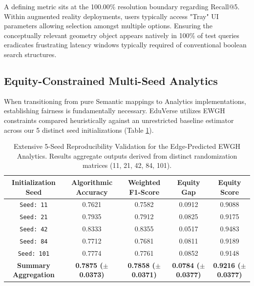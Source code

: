 \documentclass[conference]{IEEEtran}
\begin{document}
A defining metric sits at the 100.00\% resolution boundary regarding Recall@5. Within augmented reality deployments, users typically access "Tray" UI parameters allowing selection amongst multiple options. Ensuring the conceptually relevant geometry object appears natively in 100\% of test queries eradicates frustrating latency windows typically required of conventional boolean search structures. 

\subsection{Equity-Constrained Multi-Seed Analytics}

When transitioning from pure Semantic mappings to Analytics implementations, establishing fairness is fundamentally necessary. EduVerse utilizes EWGH constraints compared heuristically against an unrestricted baseline estimator across our 5 distinct seed initializations (Table \ref{tab:seed_results_ext}).

\begin{table}[t]
\centering
\caption{Extensive 5-Seed Reproducibility Validation for the Edge-Predicted EWGH Analytics. Results aggregate outputs derived from distinct randomization matrices (11, 21, 42, 84, 101).}
\label{tab:seed_results_ext}
\begin{tabular}{ccccc}
\toprule
\textbf{Initialization Seed} & \textbf{Algorithmic Accuracy} & \textbf{Weighted F1-Score} & \textbf{Equity Gap} & \textbf{Equity Score} \\
\midrule
\texttt{Seed: 11} & 0.7621 & 0.7582 & 0.0912 & 0.9088 \\
\texttt{Seed: 21} & 0.7935 & 0.7912 & 0.0825 & 0.9175 \\
\texttt{Seed: 42} & 0.8333 & 0.8355 & 0.0517 & 0.9483 \\
\texttt{Seed: 84} & 0.7712 & 0.7681 & 0.0811 & 0.9189 \\
\texttt{Seed: 101} & 0.7774 & 0.7761 & 0.0852 & 0.9148 \\
\midrule
\textbf{Summary Aggregation} & \textbf{0.7875 ($\pm$ 0.0373)} & \textbf{0.7858 ($\pm$ 0.0371)} & \textbf{0.0784 ($\pm$ 0.0377)} & \textbf{0.9216 ($\pm$ 0.0377)} \\
\bottomrule
\end{tabular}
\end{table}
\end{document}
